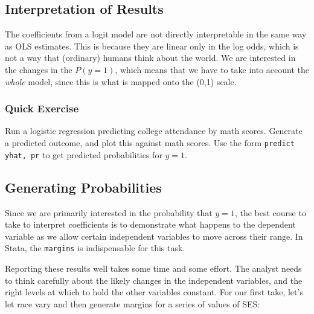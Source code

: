 \documentclass[12pt]{article}
\begin{document}
\subsection{Interpretation of Results}

The coefficients from a logit model are not directly interpretable in
the same way as OLS estimates. This is because they are linear only in
the log odds, which is not a way that (ordinary) humans think about
the world. We are interested in the changes in the $P(y=1)$, which
means that we have to take into account the \textit{whole} model,
since this is what is mapped onto the (0,1) scale. 


\subsubsection{Quick Exercise}

Run a logistic regression predicting  college attendance by
math scores. Generate a predicted outcome, and plot this against
math scores. Use the form \texttt{predict yhat, pr} to get predicted
probabilities for $y=1$. 


\subsection{Generating Probabilities}

Since we are primarily interested in the probability that $y=1$, the
best course to take to interpret coefficients is to demonstrate what
happens to the dependent variable as we allow certain independent
variables to move across their range. In Stata, the \texttt{margins}
is indispensable for this task.

Reporting these results well takes some time and some effort. The
analyst needs to think carefully about the likely changes in the
independent variables, and the right levels at which to hold the other
variables constant. For our first take, let's let race vary and then
generate margins for a series of values of SES: 
\end{document}
